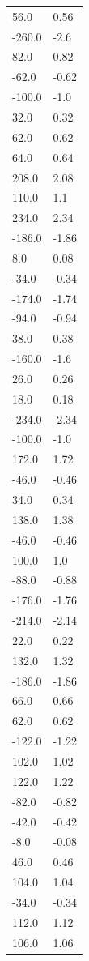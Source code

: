 \begin{longtable}{ll}
56.0 & 0.56 \\
-260.0 & -2.6 \\
82.0 & 0.82 \\
-62.0 & -0.62 \\
-100.0 & -1.0 \\
32.0 & 0.32 \\
62.0 & 0.62 \\
64.0 & 0.64 \\
208.0 & 2.08 \\
110.0 & 1.1 \\
234.0 & 2.34 \\
-186.0 & -1.86 \\
8.0 & 0.08 \\
-34.0 & -0.34 \\
-174.0 & -1.74 \\
-94.0 & -0.94 \\
38.0 & 0.38 \\
-160.0 & -1.6 \\
26.0 & 0.26 \\
18.0 & 0.18 \\
-234.0 & -2.34 \\
-100.0 & -1.0 \\
172.0 & 1.72 \\
-46.0 & -0.46 \\
34.0 & 0.34 \\
138.0 & 1.38 \\
-46.0 & -0.46 \\
100.0 & 1.0 \\
-88.0 & -0.88 \\
-176.0 & -1.76 \\
-214.0 & -2.14 \\
22.0 & 0.22 \\
132.0 & 1.32 \\
-186.0 & -1.86 \\
66.0 & 0.66 \\
62.0 & 0.62 \\
-122.0 & -1.22 \\
102.0 & 1.02 \\
122.0 & 1.22 \\
-82.0 & -0.82 \\
-42.0 & -0.42 \\
-8.0 & -0.08 \\
46.0 & 0.46 \\
104.0 & 1.04 \\
-34.0 & -0.34 \\
112.0 & 1.12 \\
106.0 & 1.06 \\

\end{longtable}
